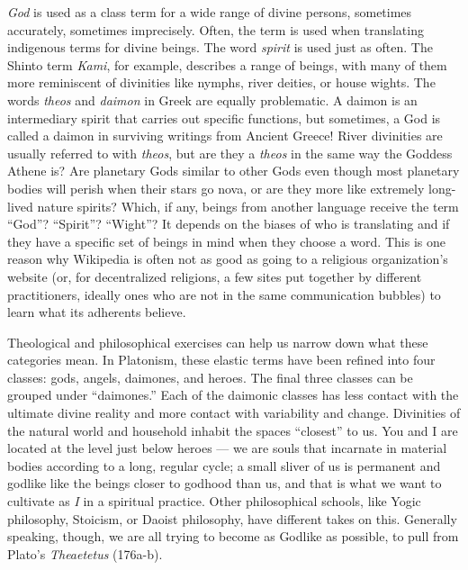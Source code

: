 \documentclass[
]{book}
\begin{document}
\emph{God} is used as a class term for a wide range of divine persons, sometimes accurately, sometimes imprecisely. Often, the term is used when translating indigenous terms for divine beings. The word \emph{spirit} is used just as often. The Shinto term \emph{Kami}, for example, describes a range of beings, with many of them more reminiscent of divinities like nymphs, river deities, or house wights. The words \emph{theos} and \emph{daimon} in Greek are equally problematic. A daimon is an intermediary spirit that carries out specific functions, but sometimes, a God is called a daimon in surviving writings from Ancient Greece! River divinities are usually referred to with \emph{theos}, but are they a \emph{theos} in the same way the Goddess Athene is? Are planetary Gods similar to other Gods even though most planetary bodies will perish when their stars go nova, or are they more like extremely long-lived nature spirits? Which, if any, beings from another language receive the term ``God''? ``Spirit''? ``Wight''? It depends on the biases of who is translating and if they have a specific set of beings in mind when they choose a word. This is one reason why Wikipedia is often not as good as going to a religious organization's website (or, for decentralized religions, a few sites put together by different practitioners, ideally ones who are not in the same communication bubbles) to learn what its adherents believe.

Theological and philosophical exercises can help us narrow down what these categories mean. In Platonism, these elastic terms have been refined into four classes: gods, angels, daimones, and heroes. The final three classes can be grouped under ``daimones.'' Each of the daimonic classes has less contact with the ultimate divine reality and more contact with variability and change. Divinities of the natural world and household inhabit the spaces ``closest'' to us. You and I are located at the level just below heroes --- we are souls that incarnate in material bodies according to a long, regular cycle; a small sliver of us is permanent and godlike like the beings closer to godhood than us, and that is what we want to cultivate as \emph{I} in a spiritual practice. Other philosophical schools, like Yogic philosophy, Stoicism, or Daoist philosophy, have different takes on this. Generally speaking, though, we are all trying to become as Godlike as possible, to pull from Plato's \emph{Theaetetus} (176a-b).
\end{document}
